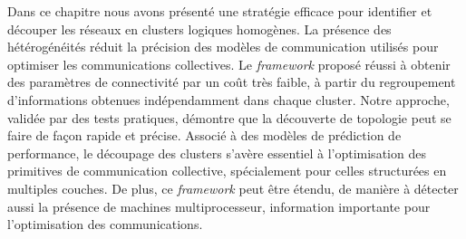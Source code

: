 Dans ce chapitre nous avons présenté une stratégie efficace pour identifier
et découper les réseaux en clusters logiques homogènes. La présence
des hétérogénéités réduit la précision des modèles de communication
utilisés pour optimiser les communications collectives. Le \emph{framework}
proposé réussi à obtenir des paramètres de connectivité par un coût
très faible, à partir du regroupement d'informations obtenues indépendamment
dans chaque cluster. Notre approche, validée par des tests pratiques,
démontre que la découverte de topologie peut se faire de façon rapide
et précise. Associé à des modèles de prédiction de performance, le
découpage des clusters s'avère essentiel à l'optimisation des primitives
de communication collective, spécialement pour celles structurées
en multiples couches. De plus, ce \emph{framework} peut être étendu,
de manière à détecter aussi la présence de machines multiprocesseur,
information importante pour l'optimisation des communications.


